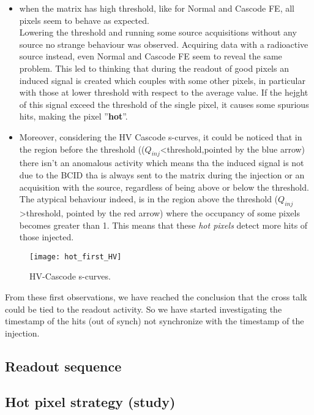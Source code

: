 \begin{itemize}
\item when the matrix has high threshold, like for Normal and Cascode FE, all pixels seem to behave as expected.\\ Lowering the threshold and running some source acquisitions without any source no strange behaviour was observed. Acquiring data with a radioactive source instead, even Normal and Cascode FE seem to reveal the same problem. This led to thinking that during the readout of good pixels an induced signal is created which couples with some other pixels, in particular with those at lower threshold with respect to the average value. If the hejght of this signal exceed the threshold of the single pixel, it causes some spurious hits, making the pixel ''\textbf{hot}''.

\item Moreover, considering the HV Cascode s-curves, it could be noticed that in the region before the threshold (($Q_{inj}$<threshold,pointed by the blue arrow) there isn't an anomalous activity which means tha the induced signal is not due to the BCID tha is always sent to the matrix during the injection or an acquisition with the source, regardless of being above or below the  threshold. The atypical behaviour indeed, is in the region above the threshold ($Q_{inj}$>threshold, pointed by the red arrow) where the occupancy of some pixels becomes greater than 1. This means that these \textit{hot pixels} detect more hits of those injected.

\end{itemize} 

\begin{figure}[h!]
\centering
\texttt{[image: hot\_first\_HV]}
\caption{HV-Cascode s-curves.}
\label{hot_first}
\end{figure}

From these first observations, we have reached the conclusion that the cross talk could be tied to the readout activity. So we have started investigating the timestamp of the hits (out of synch) not synchronize with the timestamp of the injection.


\subsection{Readout sequence}    %

\subsection{Hot pixel strategy (study)}

